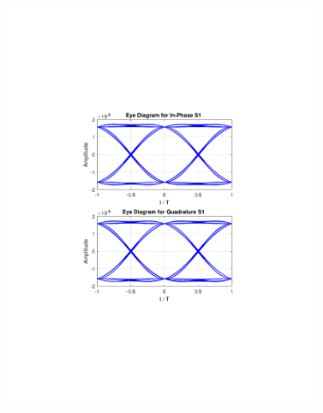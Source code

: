 \begin{figure}[h]
	\centering
	\begin{subfigure}{.5\textwidth}
		\centering
		\includegraphics[clip, trim=5cm 7cm 5cm 7cm, width=\textwidth]{./sdf/m_qam_system/figures/eye120db09ro.pdf}
	\end{subfigure}%
	\begin{subfigure}{.5\textwidth}
		\centering

\end{subfigure}
\end{figure}
